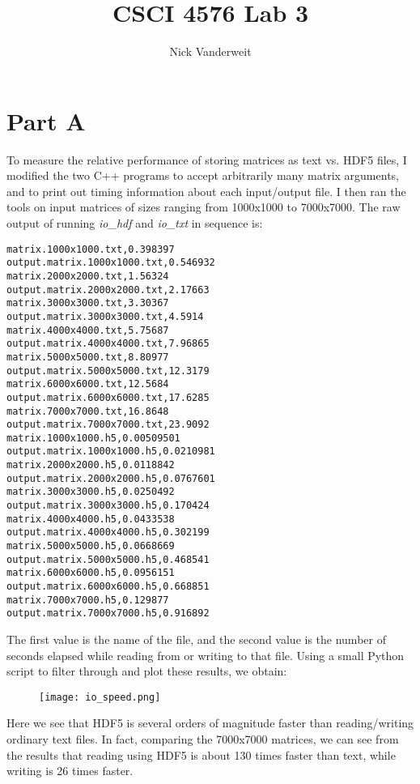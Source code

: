 \documentclass{article}
\title{CSCI 4576 Lab 3}
\author{Nick Vanderweit}
\begin{document}
\maketitle
\section*{Part A}
To measure the relative performance of storing matrices as text vs. HDF5 files,
I modified the two C++ programs to accept arbitrarily many matrix arguments,
and to print out timing information about each input/output file. I then ran
the tools on input matrices of sizes ranging from 1000x1000 to 7000x7000. The
raw output of running \emph{io\_hdf} and \emph{io\_txt} in sequence is:

\begin{verbatim}
matrix.1000x1000.txt,0.398397
output.matrix.1000x1000.txt,0.546932
matrix.2000x2000.txt,1.56324
output.matrix.2000x2000.txt,2.17663
matrix.3000x3000.txt,3.30367
output.matrix.3000x3000.txt,4.5914
matrix.4000x4000.txt,5.75687
output.matrix.4000x4000.txt,7.96865
matrix.5000x5000.txt,8.80977
output.matrix.5000x5000.txt,12.3179
matrix.6000x6000.txt,12.5684
output.matrix.6000x6000.txt,17.6285
matrix.7000x7000.txt,16.8648
output.matrix.7000x7000.txt,23.9092
matrix.1000x1000.h5,0.00509501
output.matrix.1000x1000.h5,0.0210981
matrix.2000x2000.h5,0.0118842
output.matrix.2000x2000.h5,0.0767601
matrix.3000x3000.h5,0.0250492
output.matrix.3000x3000.h5,0.170424
matrix.4000x4000.h5,0.0433538
output.matrix.4000x4000.h5,0.302199
matrix.5000x5000.h5,0.0668669
output.matrix.5000x5000.h5,0.468541
matrix.6000x6000.h5,0.0956151
output.matrix.6000x6000.h5,0.668851
matrix.7000x7000.h5,0.129877
output.matrix.7000x7000.h5,0.916892
\end{verbatim}

The first value is the name of the file, and the second value is the number of
seconds elapsed while reading from or writing to that file. Using a small
Python script to filter through and plot these results, we obtain:

\begin{figure}[h!]
\texttt{[image: io\_speed.png]}
\end{figure}

Here we see that HDF5 is several orders of magnitude faster than reading/writing
ordinary text files. In fact, comparing the 7000x7000 matrices, we can see
from the results that reading using HDF5 is about 130 times faster than text,
while writing is 26 times faster.
\end{document}
